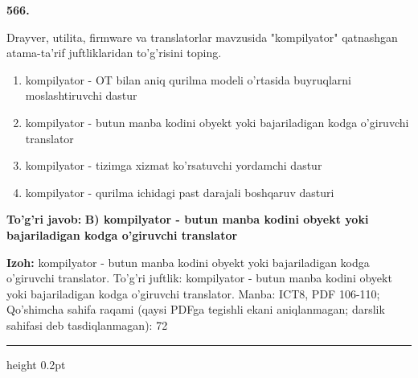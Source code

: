 \documentclass[10pt,a4paper]{article}
\begin{document}
{\bfseries\sffamily\color{ink} 566.}
\par
Drayver, utilita, firmware va translatorlar mavzusida "kompilyator" qatnashgan atama-ta'rif juftliklaridan to'g'risini toping.
\begin{enumerate}[label=\Alph*),leftmargin=9mm]
\item kompilyator - OT bilan aniq qurilma modeli o'rtasida buyruqlarni moslashtiruvchi dastur
\item kompilyator - butun manba kodini obyekt yoki bajariladigan kodga o'giruvchi translator
\item kompilyator - tizimga xizmat ko'rsatuvchi yordamchi dastur
\item kompilyator - qurilma ichidagi past darajali boshqaruv dasturi
\end{enumerate}
\begin{tcolorbox}[enhanced,breakable,colback=teal!4,colframe=teal!60!black,boxrule=0.45pt,arc=1.2mm,left=2.7mm,right=2.7mm,top=1.8mm,bottom=1.8mm,before skip=2mm,after skip=2mm]
{\bfseries\sffamily\color{teal}To'g'ri javob:} \textbf{B) kompilyator - butun manba kodini obyekt yoki bajariladigan kodga o'giruvchi translator}
\par\smallskip
{\bfseries Izoh:} kompilyator - butun manba kodini obyekt yoki bajariladigan kodga o'giruvchi translator. To'g'ri juftlik: kompilyator - butun manba kodini obyekt yoki bajariladigan kodga o'giruvchi translator. Manba: ICT8, PDF 106-110; Qo'shimcha sahifa raqami (qaysi PDFga tegishli ekani aniqlanmagan; darslik sahifasi deb tasdiqlanmagan): 72
\end{tcolorbox}
\vspace{2mm}\hrule height 0.2pt\vspace{3mm}
\end{document}
